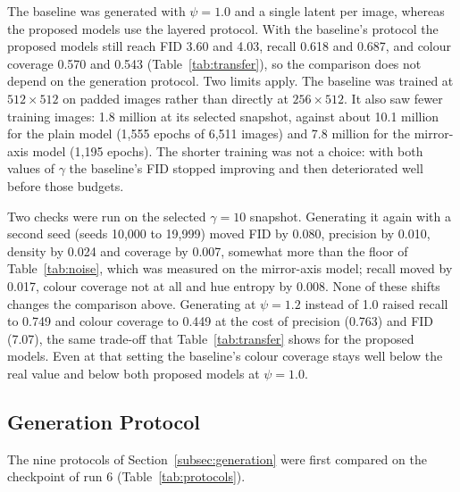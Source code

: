 \documentclass[electronics,article,submit,pdftex,moreauthors]{Definitions/mdpi}
\begin{document}
The baseline was generated with $\psi = 1.0$ and a single latent per image,
whereas the proposed models use the layered protocol. With the baseline's
protocol the proposed models still reach FID 3.60 and 4.03, recall 0.618 and
0.687, and colour coverage 0.570 and 0.543 (Table~\ref{tab:transfer}), so the
comparison does not depend on the generation protocol. Two limits apply. The
baseline was trained at $512 \times 512$ on padded images rather than
directly at $256 \times 512$. It also saw fewer training images: 1.8 million
at its selected snapshot, against about 10.1 million for the plain model
(1,555 epochs of 6,511 images) and 7.8 million for the mirror-axis model
(1,195 epochs). The shorter training was not a choice: with both values of
$\gamma$ the baseline's FID stopped improving and then deteriorated well
before those budgets.

Two checks were run on the selected $\gamma = 10$ snapshot. Generating it
again with a second seed (seeds 10,000 to 19,999) moved FID by 0.080,
precision by 0.010, density by 0.024 and coverage by 0.007, somewhat more
than the floor of Table~\ref{tab:noise}, which was measured on the
mirror-axis model; recall moved by 0.017, colour coverage not at all and hue
entropy by 0.008. None of these shifts changes the comparison above.
Generating at $\psi = 1.2$ instead of 1.0 raised recall to 0.749 and colour
coverage to 0.449 at the cost of precision (0.763) and FID (7.07), the same
trade-off that Table~\ref{tab:transfer} shows for the proposed models. Even
at that setting the baseline's colour coverage stays well below the real
value and below both proposed models at $\psi = 1.0$.

\subsection{Generation Protocol}
\label{subsec:transfer}

The nine protocols of Section~\ref{subsec:generation} were first compared on
the checkpoint of run 6 (Table~\ref{tab:protocols}).
\end{document}
